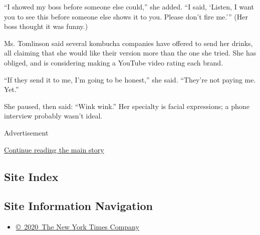 ``I showed my boss before someone else could,'' she added. ``I said,
`Listen, I want you to see this before someone else shows it to you.
Please don't fire me.''' (Her boss thought it was funny.)

Ms. Tomlinson said several kombucha companies have offered to send her
drinks, all claiming that she would like their version more than the one
she tried. She has obliged, and is considering making a YouTube video
rating each brand.

``If they send it to me, I'm going to be honest,'' she said. ``They're
not paying me. Yet.''

She paused, then said: ``Wink wink.'' Her specialty is facial
expressions; a phone interview probably wasn't ideal.

Advertisement

\protect\hyperlink{after-bottom}{Continue reading the main story}

\hypertarget{site-index}{%
\subsection{Site Index}\label{site-index}}

\hypertarget{site-information-navigation}{%
\subsection{Site Information
Navigation}\label{site-information-navigation}}

\begin{itemize}
\tightlist
\item
  \href{https://help.nytimes3xbfgragh.onion/hc/en-us/articles/115014792127-Copyright-notice}{©~2020~The
  New York Times Company}
\end{itemize}

